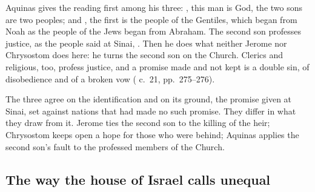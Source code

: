 Aquinas gives the reading first among his three: , this man is God, the two sons are two peoples; and
, the first is the people of the Gentiles, which began from Noah as
the people of the Jews began from Abraham. The second son professes justice, as
the people said at Sinai, . Then he does what neither Jerome nor Chrysostom does here: he turns
the second son on the Church. Clerics and religious, too, profess justice, and
a promise made and not kept is a double sin, of disobedience and of a broken
vow ( c.~21, pp.~275--276).

The three agree on the identification and on its ground, the promise given at
Sinai, set against nations that had made no such promise. They differ in what they draw from
it. Jerome ties the second son to the killing of the heir; Chrysostom keeps
open a hope for those who were behind; Aquinas applies the second son's fault to
the professed members of the Church.

\subsection{The way the house of Israel calls unequal}

